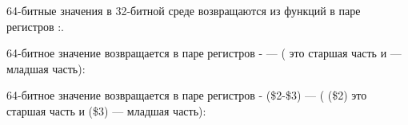 ﻿




64-битные значения в 32-битной среде возвращаются из функций в паре регистров \EDX{}:\EAX{}.




64-битное значение возвращается в паре регистров - --- ( это старшая часть и  --- младшая часть):




64-битное значение возвращается в паре регистров - (\$2-\$3) --- ( (\$2) это старшая часть и  (\$3) --- младшая часть):





